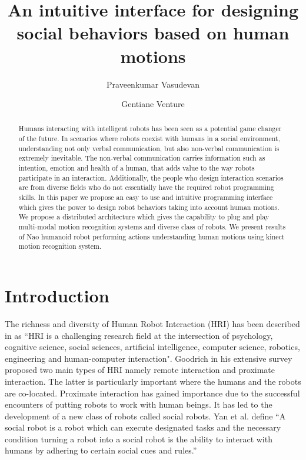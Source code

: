 \documentclass{llncs}
\title{An intuitive interface for designing social behaviors based on human motions}
\author{Praveenkumar Vasudevan\inst{1} \and Gentiane Venture\inst{2}}
\institute{Graduate Student, \'{E}cole Centrale de Nantes, Nantes, France,\\
\email{praveenv4k@gmail.com}
\and
Associate Professor, Tokyo University of Agriculture and Technology, Japan\\
\email{venture@cc.tuat.ac.jp}}
\begin{document}
\maketitle   
\begin{abstract}
	Humans interacting with intelligent robots has been seen as a potential game changer of the future. In scenarios where robots coexist with humans in a social environment, understanding not only verbal communication, but also non-verbal communication is extremely inevitable. The non-verbal communication carries information such as intention, emotion and health of a human, that adds value to the way robots participate in an interaction. Additionally, the people who design interaction scenarios are from diverse fields who do not essentially have the required robot programming skills. In this paper we propose an easy to use and intuitive programming interface which gives the power to design robot behaviors taking into account human motions. We propose a distributed architecture which gives the capability to plug and play multi-modal motion recognition systems and diverse class of robots. We present results of Nao humanoid robot performing actions understanding human motions using kinect motion recognition system.
\end{abstract}
\section{Introduction}
The richness and diversity of Human Robot Interaction (HRI) has been described in \cite{dautenhahn2007methodology} as ``HRI is a challenging research field at the intersection of psychology, cognitive science, social sciences, artificial intelligence, computer science, robotics, engineering and human-computer interaction". Goodrich in his extensive survey \cite{goodrich2007human} proposed two main types of HRI namely remote interaction and proximate interaction. The latter is particularly important where the humans and the robots are co-located. Proximate interaction has gained importance due to the successful encounters of putting robots to work with human beings. It has led to the development of a new class of robots called social robots. Yan et al. \cite{yan2014survey} define ``A social robot is a robot which can execute designated tasks and the necessary condition turning a robot into a social robot is the ability to interact with humans by adhering to certain social cues and rules.''
\end{document}

